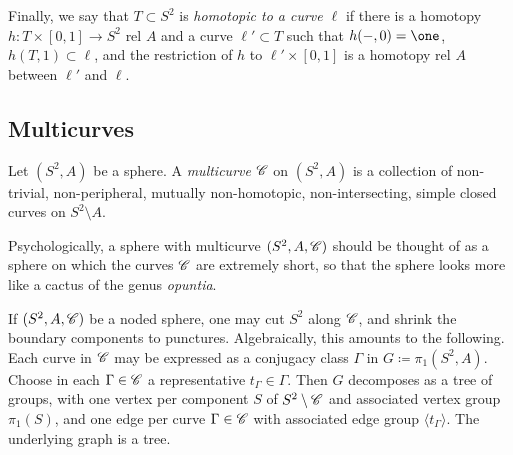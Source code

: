 \documentclass{amsart}
\begin{document}
Finally, we say that $T\subset S^2$ is \emph{homotopic to a curve
  $\ell$} if there is a homotopy $h\colon T\times [0,1]\to S^2$ rel
$A$ and a curve $\ell'\subset T$ such that $h(-,0)=\one$,
$h(T,1)\subset \ell$, and the restriction of $h$ to $\ell'\times[0,1]$
is a homotopy rel $A$ between $\ell'$ and $\ell$.

\subsection{Multicurves}\label{ss:multicurves}
Let $(S^2,A)$ be a sphere. A \emph{multicurve} ${\mathscr C}$ on $(S^2,A)$ is a
collection of non-trivial, non-peripheral, mutually non-homotopic,
non-intersecting, simple closed curves on $S^2\setminus A$.

Psychologically, a sphere with multicurve $(S^2,A,{\mathscr C})$ should be
thought of as a sphere on which the curves ${\mathscr C}$ are extremely short,
so that the sphere looks more like a cactus of the genus
\emph{opuntia}.

If $(S^2,A,{\mathscr C})$ be a noded sphere, one may cut $S^2$ along ${\mathscr C}$, and
shrink the boundary components to punctures. Algebraically, this
amounts to the following. Each curve in ${\mathscr C}$ may be expressed as a
conjugacy class $\Gamma$ in $G\coloneqq\pi_1(S^2,A)$. Choose in each
$\Gamma\in{\mathscr C}$ a representative $t_\Gamma\in\Gamma$. Then $G$
decomposes as a tree of groups, with one vertex per component $S$ of
$S^2\setminus{\mathscr C}$ and associated vertex group $\pi_1(S)$, and one edge
per curve $\Gamma\in{\mathscr C}$ with associated edge group $\langle
t_\Gamma\rangle$. The underlying graph is a tree.
\end{document}
